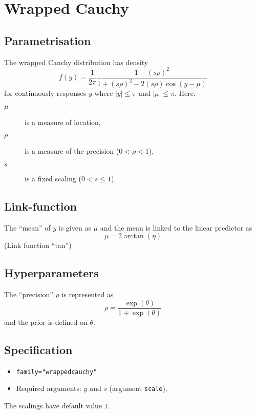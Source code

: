 \documentclass[a4paper,11pt]{article}
\begin{document}
\section*{Wrapped Cauchy}

\subsection*{Parametrisation}

The wrapped Cauchy distribution has density
\begin{displaymath}
    f(y) =\frac{1}{2\pi}\frac{1-{(s\rho)^2}}{1+(s\rho)^2-2(s\rho)\cos(y-\mu)} 
\end{displaymath}
for continuously responses $y$ where
$|y| \le \pi$ and $|\mu| \le \pi$. Here, 
\begin{description}
\item[$\mu$] is a measure of location, 
\item[$\rho$] is a measure of the precision ($0<\rho<1$),
\item[$s$] is a fixed scaling ($0<s\le1$).
\end{description}

\subsection*{Link-function}

The ``mean'' of $y$ is given as $\mu$ and the mean is linked to the
linear predictor as
\begin{displaymath}
    \mu = 2\arctan(\eta)
\end{displaymath}
(Link function ``tan'')

\subsection*{Hyperparameters}

The ``precision'' $\rho$ is represented as
\begin{displaymath}
    \rho = \frac{\exp(\theta)}{1+\exp(\theta)}
\end{displaymath}
and the prior is defined on $\theta$. 

\subsection*{Specification}

\begin{itemize}
\item \texttt{family="wrappedcauchy"}
\item Required arguments: $y$ and $s$ (argument \texttt{scale}).
\end{itemize}
The scalings have default value $1$.
\end{document}
